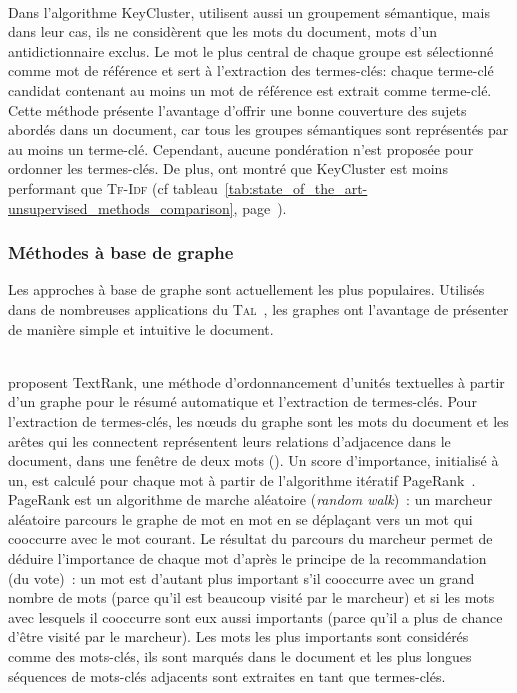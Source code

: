         ~\\Dans l'algorithme KeyCluster,  utilisent
        aussi un groupement sémantique, mais dans leur cas, ils ne considèrent
        que les mots du document, mots d'un antidictionnaire exclus. Le mot le
        plus central de chaque groupe est sélectionné comme mot de référence et
        sert à l'extraction des termes-clés: chaque terme-clé candidat contenant
        au moins un mot de référence est extrait comme terme-clé. Cette méthode
        présente l'avantage d'offrir une bonne couverture des sujets abordés
        dans un document, car tous les groupes sémantiques sont représentés par
        au moins un terme-clé. Cependant, aucune pondération n'est proposée pour
        ordonner les termes-clés. De plus,  ont
        montré que KeyCluster est moins performant que \textsc{Tf-Idf}
        (cf tableau~\ref{tab:state_of_the_art-unsupervised_methods_comparison},
        page~\pageref{tab:state_of_the_art-unsupervised_methods_comparison}).

      \subsubsection{Méthodes à base de graphe}
      \label{subsubsec:main-state_of_the_art-automatic_keyphrase_extraction-unsupervised_keyphrase_extraction-graph_based_approaches}
        Les approches à base de graphe sont actuellement les plus populaires.
        Utilisés dans de nombreuses applications du
        \textsc{Tal}~\cite{kozareva2013textgraphs}, les graphes ont l'avantage
        de présenter de manière simple et intuitive le document.

        ~\\ proposent TextRank, une méthode
        d'ordonnancement d'unités textuelles à partir d'un graphe pour le résumé
        automatique et l'extraction de termes-clés. Pour l'extraction de
        termes-clés, les n\oe{}uds du graphe sont les mots du document et les
        arêtes qui les connectent représentent leurs relations d'adjacence dans
        le document, dans une fenêtre de deux mots (). Un score
        d'importance, initialisé à un, est calculé pour chaque mot à partir de
        l'algorithme itératif PageRank~\cite{brin1998pagerank}. PageRank est un
        algorithme de marche aléatoire (\textit{random walk})~: un marcheur
        aléatoire parcours le graphe de mot en mot en se déplaçant vers un mot
        qui cooccurre avec le mot courant. Le résultat du parcours du marcheur
        permet de déduire l'importance de chaque mot d'après le principe de la
        recommandation (du vote)~:  un mot est d'autant plus important s'il
        cooccurre avec un grand nombre de mots (parce qu'il est beaucoup visité
        par le marcheur) et si les mots avec lesquels il cooccurre sont eux
        aussi importants (parce qu'il a plus de chance d'être visité par le
        marcheur). Les mots les plus importants sont considérés comme des
        mots-clés, ils sont marqués dans le document et les plus longues
        séquences de mots-clés adjacents sont extraites en tant que termes-clés.
      
